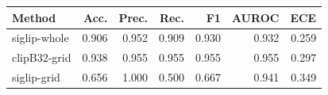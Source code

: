 \begin{tabular}{lrrrrrr}
\toprule
Method & Acc. & Prec. & Rec. & F1 & AUROC & ECE \\
\midrule
siglip-whole & 0.906 & 0.952 & 0.909 & 0.930 & 0.932 & 0.259 \\
clipB32-grid & 0.938 & 0.955 & 0.955 & 0.955 & 0.955 & 0.297 \\
siglip-grid & 0.656 & 1.000 & 0.500 & 0.667 & 0.941 & 0.349 \\
\bottomrule
\end{tabular}
